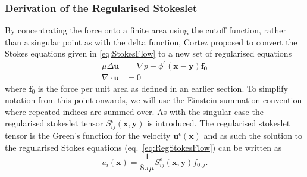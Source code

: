 \subsubsection{Derivation of the Regularised Stokeslet}
 By concentrating the force onto a finite area using the cutoff function, rather than a singular point as with the delta function, Cortez proposed to convert the Stokes equations given in \cref{eq:StokesFlow} to a new set of regularised equations
\begin{subequations}
\label{eq:RegStokesFlow}
\begin{align}
    \mu\Delta\boldsymbol{u} &= \nabla p - \phi^{\epsilon}(\bm{x}-\bm{y})\bm{f_0} \label{eq:RegStokesFlow1} \\
    \nabla \cdot \boldsymbol{u} &= 0 \label{eq:RegStokesFlow2}
\end{align}
\end{subequations}
where $\bm{f}_0$ is the force per unit area as defined in an earlier section.
To simplify notation from this point onwards, we will use the Einstein summation convention where repeated indices are summed over. As with the singular case the regularised stokeslet tensor $S^\epsilon_{ij}(\bm{x},\bm{y})$ is introduced. The regularised stokeslet tensor is the Green's function for the velocity $\mathbf{u}^\epsilon(\bm{x})$ and as such the solution to the regularised Stokes equations (eq.~\ref{eq:RegStokesFlow}) can be written as
\begin{equation}
\label{eq:regvelsol}
    u_i(\bm{x}) = \frac{1}{8\pi\mu}S^\epsilon_{ij}(\bm{x},\bm{y})f_{0,j}.
\end{equation}

